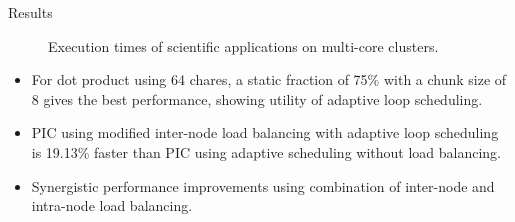 \begin{frame}{Results}
\begin{figure}[ht!]
          \begin{center}
          \end{center}
          \caption{\tiny Execution times of scientific applications on multi-core clusters.}\label{fig:scalability-results-PIC-BW}
        \end{figure}
        
        

\begin{itemize} 
\item \tiny For dot product using 64 chares, a static fraction of 75\% with a chunk size of 8 gives the best performance, showing utility of adaptive loop scheduling.
\item \tiny PIC using modified inter-node load balancing with adaptive loop scheduling is 19.13\% faster than PIC using adaptive scheduling without load balancing.
\item \tiny Synergistic performance improvements using combination of inter-node and intra-node load balancing. 
\end{itemize} 
\end{frame}

